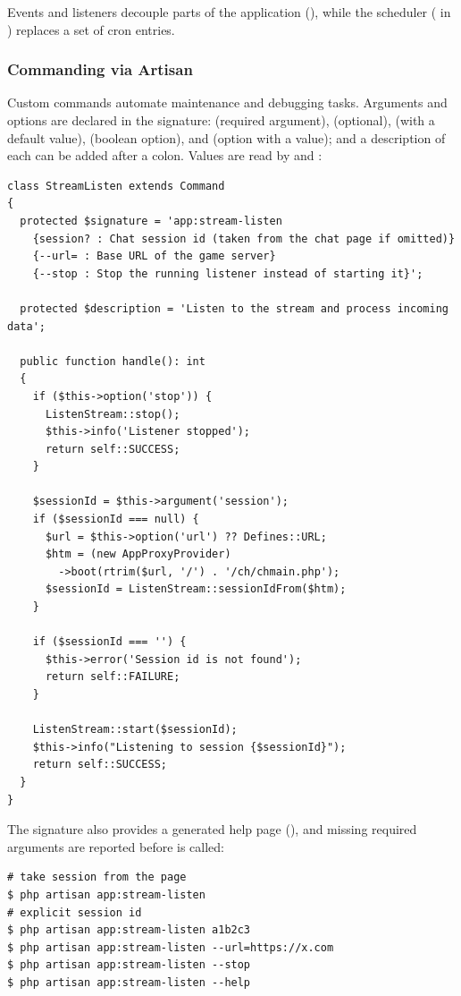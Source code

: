 \noindent Events and listeners decouple parts of the application
(), while the scheduler
( in ) replaces a set of cron entries.


\subsubsection{Commanding via Artisan}

Custom commands automate maintenance and debugging tasks. Arguments and options are declared in
the signature:  (required argument),  (optional), 
(with a default value),  (boolean option), and  (option with a
value); and a description of each can be added after a colon. Values are read by
 and :

\begin{lstlisting}
class StreamListen extends Command
{
  protected $signature = 'app:stream-listen
    {session? : Chat session id (taken from the chat page if omitted)}
    {--url= : Base URL of the game server}
    {--stop : Stop the running listener instead of starting it}';

  protected $description = 'Listen to the stream and process incoming data';

  public function handle(): int
  {
    if ($this->option('stop')) {
      ListenStream::stop();
      $this->info('Listener stopped');
      return self::SUCCESS;
    }

    $sessionId = $this->argument('session');
    if ($sessionId === null) {
      $url = $this->option('url') ?? Defines::URL;
      $htm = (new AppProxyProvider)
        ->boot(rtrim($url, '/') . '/ch/chmain.php');
      $sessionId = ListenStream::sessionIdFrom($htm);
    }

    if ($sessionId === '') {
      $this->error('Session id is not found');
      return self::FAILURE;
    }

    ListenStream::start($sessionId);
    $this->info("Listening to session {$sessionId}");
    return self::SUCCESS;
  }
}
\end{lstlisting}

\noindent The signature also provides a generated help page (), and missing required
arguments are reported before  is called:

\begin{lstlisting}[language=terminal]
# take session from the page
$ php artisan app:stream-listen
# explicit session id
$ php artisan app:stream-listen a1b2c3
$ php artisan app:stream-listen --url=https://x.com
$ php artisan app:stream-listen --stop
$ php artisan app:stream-listen --help
\end{lstlisting}


